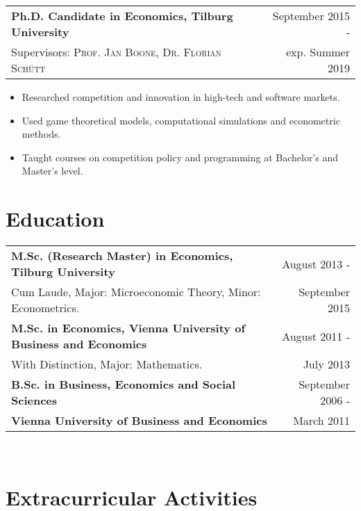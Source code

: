 \documentclass[a4paper,9pt]{article}
\begin{document}
\begin{tabular}{p{15cm} r}
	\textbf{Ph.D. Candidate in Economics, Tilburg University} &September 2015 -\\
	\small Supervisors:  \textsc{Prof. Jan Boone},  \textsc{Dr. Florian Schütt} & exp. Summer 2019\phantom{ -}\\
\end{tabular}\vspace{-0.5em}
\begin{itemize}[noitemsep]
	\item Researched competition and innovation in high-tech and software markets.
	\item Used game theoretical models, computational simulations and econometric methods.
	\item Taught courses on competition policy and programming at Bachelor's and Master's level.
\end{itemize}

\section{Education}%

\begin{tabular}{p{15cm} r}
	\textbf{M.Sc. (Research Master) in Economics, Tilburg University}&  August 2013 -\\
	Cum Laude, Major: Microeconomic Theory, Minor: Econometrics.& September 2015\hphantom{-}
	\vspace{0.5em}\\
	\textbf{M.Sc. in Economics, Vienna University of Business and Economics}& August 2011 -\\
	With Distinction, Major: Mathematics. & July 2013\phantom{-}
	\vspace{0.5em}\\ 
	\textbf{B.Sc. in Business, Economics and Social Sciences}& September 2006 -\\ 
	\textbf{Vienna University of Business and Economics}& March 2011\phantom{- }\\
\end{tabular}\\

\section{Extracurricular Activities }
\end{document}
